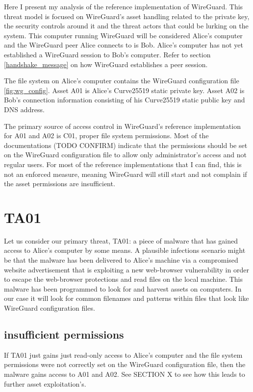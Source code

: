 \documentclass [11pt, proquest] {uwthesis}[2020/02/24]
\begin{document}
Here I present my analysis of the reference implementation of WireGuard. This threat model is focused on WireGuard's asset handling related to the private key, the security controls around it and the threat actors that could be lurking on the system. This computer running WireGuard will be considered Alice's computer and the WireGuard peer Alice connects to is Bob. Alice's computer has not yet established a WireGuard session to Bob's computer. Refer to section \ref{handshake_message} on how WireGuard establishes a peer session.

The file system on Alice's computer contains the WireGuard configuration file \ref{fig:wg_config}. 
Asset A01 is Alice's Curve25519 static private key. Asset A02 is Bob's connection information consisting of his Curve25519 static public key and DNS address.

The primary source of access control in WireGuard's reference implementation for A01 and A02 is C01, proper file system permissions. Most of the documentations (TODO CONFIRM) indicate that the permissions should be set on the WireGuard configuration file to allow only administrator's access and not regular users. For most of the reference implementations that I can find, this is not an enforced measure, meaning WireGuard will still start and not complain if the asset permissions are insufficient. 

\section{TA01}
Let us consider our primary threat, TA01: a piece of malware that has gained access to Alice's computer by some means. A plausible infections scenario might be that the malware has been delivered to Alice's machine via a compromised website advertisement that is exploiting a new web-browser vulnerability in order to escape the web-browser protections and read files on the local machine.  This malware has been programmed to look for and harvest assets on computers. In our case it will look for common filenames and patterns within files that look like WireGuard configuration files. 
\subsection{insufficient permissions}
If TA01 just gains just read-only access to Alice's computer and the file system permissions were not correctly set on the WireGuard configuration file, then the malware gains access to A01 and A02. See SECTION X to see how this leads to further asset exploitation's.
\end{document}

